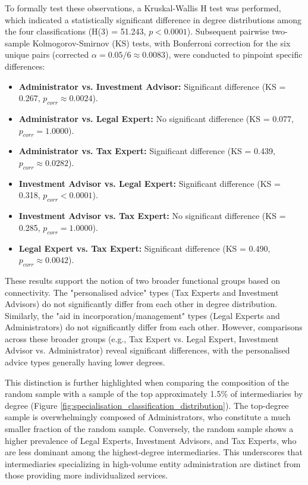 To formally test these observations, a Kruskal-Wallis H test was performed, which indicated a statistically significant difference in degree distributions among the four classifications (H(3) = 51.243, $p < 0.0001$). Subsequent pairwise two-sample Kolmogorov-Smirnov (KS) tests, with Bonferroni correction for the six unique pairs (corrected $\alpha = 0.05/6 \approx 0.0083$), were conducted to pinpoint specific differences:
\begin{itemize}
    \item \textbf{Administrator vs. Investment Advisor:} Significant difference (KS = 0.267, $p_{corr} \approx 0.0024$).
    \item \textbf{Administrator vs. Legal Expert:} No significant difference (KS = 0.077, $p_{corr} = 1.0000$).
    \item \textbf{Administrator vs. Tax Expert:} Significant difference (KS = 0.439, $p_{corr} \approx 0.0282$).
    \item \textbf{Investment Advisor vs. Legal Expert:} Significant difference (KS = 0.318, $p_{corr} < 0.0001$).
    \item \textbf{Investment Advisor vs. Tax Expert:} No significant difference (KS = 0.285, $p_{corr} = 1.0000$). %
    \item \textbf{Legal Expert vs. Tax Expert:} Significant difference (KS = 0.490, $p_{corr} \approx 0.0042$).
\end{itemize}
These results support the notion of two broader functional groups based on connectivity. The "personalised advice" types (Tax Experts and Investment Advisors) do not significantly differ from each other in degree distribution. Similarly, the "aid in incorporation/management" types (Legal Experts and Administrators) do not significantly differ from each other. However, comparisons across these broader groups (e.g., Tax Expert vs. Legal Expert, Investment Advisor vs. Administrator) reveal significant differences, with the personalised advice types generally having lower degrees.

This distinction is further highlighted when comparing the composition of the random sample with a sample of the top approximately 1.5\% of intermediaries by degree (Figure \ref{fig:specialisation_classification_distribution}). The top-degree sample is overwhelmingly composed of Administrators, who constitute a much smaller fraction of the random sample. Conversely, the random sample shows a higher prevalence of Legal Experts, Investment Advisors, and Tax Experts, who are less dominant among the highest-degree intermediaries. This underscores that intermediaries specializing in high-volume entity administration are distinct from those providing more individualized services.

